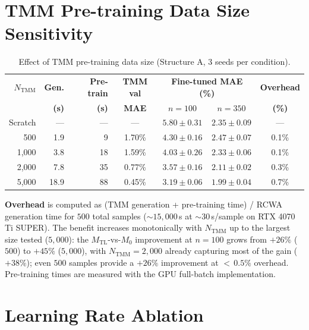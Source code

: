 \documentclass[11pt]{article}
\newcommand{\Mzero}{\ensuremath{M_0}}
\newcommand{\Mtl}{\ensuremath{M_\text{TL}}}
\begin{document}
\section{TMM Pre-training Data Size Sensitivity}
\label{sec:si_tmm_size}

\begin{table}[htbp]\centering\small
\caption{Effect of TMM pre-training data size (Structure A, 3 seeds per condition).}
\label{tab:tmm_size}
\begin{tabular}{r rr c cc c}\toprule
$N_\text{TMM}$ & \textbf{Gen.} & \textbf{Pre-train} & \textbf{TMM val} & \multicolumn{2}{c}{\textbf{Fine-tuned MAE (\%)}} & \textbf{Overhead}\\
 & \textbf{(s)} & \textbf{(s)} & \textbf{MAE} & $n=100$ & $n=350$ & \textbf{(\%)}\\\midrule
Scratch & --- & --- & --- & $5.80 \pm 0.31$ & $2.35 \pm 0.09$ & ---\\
500     & 1.9  & 9   & 1.70\% & $4.30 \pm 0.16$ & $2.47 \pm 0.07$ & 0.1\%\\
1{,}000 & 3.8  & 18  & 1.59\% & $4.03 \pm 0.26$ & $2.33 \pm 0.06$ & 0.1\%\\
2{,}000 & 7.8  & 35  & 0.77\% & $3.57 \pm 0.16$ & $2.11 \pm 0.02$ & 0.3\%\\
5{,}000 & 18.9 & 88  & 0.45\% & $\mathbf{3.19 \pm 0.06}$ & $\mathbf{1.99 \pm 0.04}$ & 0.7\%\\\bottomrule
\end{tabular}
\end{table}

\textbf{Overhead} is computed as (TMM generation + pre-training time) / RCWA generation time for $500$ total samples (${\sim}15{,}000$\,s at ${\sim}30$\,s/sample on RTX 4070 Ti SUPER). The benefit increases monotonically with $N_\text{TMM}$ up to the largest size tested ($5{,}000$): the $\Mtl$-vs-$\Mzero$ improvement at $n=100$ grows from $+26\%$ ($500$) to $+45\%$ ($5{,}000$), with $N_\text{TMM}=2{,}000$ already capturing most of the gain ($+38\%$); even $500$ samples provide a $+26\%$ improvement at ${<}\,0.5\%$ overhead. Pre-training times are measured with the GPU full-batch implementation.


\section{Learning Rate Ablation}
\label{sec:si_lr}
\end{document}
